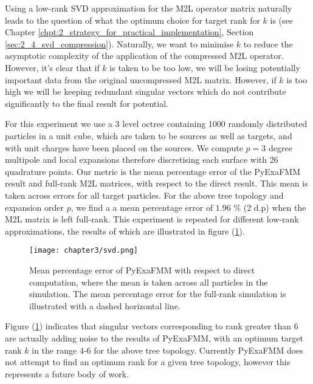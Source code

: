 Using a low-rank \gls{SVD} approximation for the \gls{M2L} operator matrix
naturally leads to the question of what the optimum choice for target rank for $k$
is (see Chapter \ref{chpt:2_strategy_for_practical_implementation}, Section \ref{sec:2_4_svd_compression}).
Naturally, we want to minimise $k$ to reduce the asymptotic complexity of
the application of the compressed \gls{M2L} operator. However, it's clear that
if $k$ is taken to be too low, we will be losing potentially important data
from the original uncompressed \gls{M2L} matrix. However, if $k$ is too high
we will be keeping redundant singular vectors which do not contribute significantly
to the final result for potential.

For this experiment we use a 3 level octree containing 1000 randomly distributed
particles in a unit cube, which are taken to be sources as well as targets, and
with unit charges have been placed on the sources. We compute $p=3$ degree multipole and
local expansions therefore discretising each surface with 26 quadrature points.
Our metric is the mean percentage error of the \gls{PyExaFMM} result and
full-rank \gls{M2L} matrices, with respect to the direct result.
This mean is taken across errors for all target particles. For the above
tree topology and expansion order $p$, we find a a mean percentage error of
$1.96$ \% (2 d.p) when the \gls{M2L} matrix is left full-rank.
This experiment is repeated for different low-rank approximations,
the results of which are illustrated in figure (\ref{fig:3_2_svd}).

\begin{figure}[ht]
    \centering

  {\texttt{[image: chapter3/svd.png]}}
  \vspace{0pt}
    \caption{Mean percentage error of \gls{PyExaFMM} with respect to direct
    computation, where the mean is taken across all particles in the simulation.
    The mean percentage error for the full-rank simulation is illustrated with
    a dashed horizontal line.
    }
    \label{fig:3_2_svd}
\end{figure}

Figure (\ref{fig:3_2_svd}) indicates that singular vectors corresponding to rank
greater than 6 are actually adding noise to the results of \gls{PyExaFMM}, with
an optimum target rank $k$ in the range 4-6 for the above tree topology. Currently
\gls{PyExaFMM} does not attempt to find an optimum rank for a given tree topology,
however this represents a future body of work.
